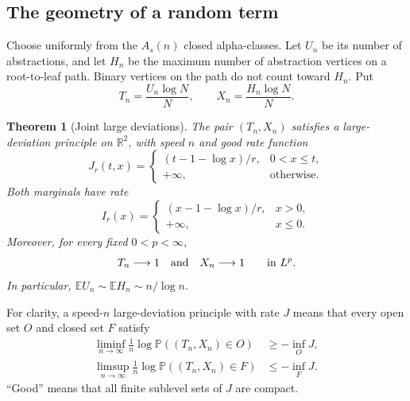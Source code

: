 \documentclass[11pt,a4paper]{article}
\numberwithin{equation}{section}
\newtheorem{theorem}{Theorem}[section]
\theoremstyle{remark}
\newcommand{\R}{\mathbb R}
\newcommand{\Prob}{\mathbb P}
\newcommand{\E}{\mathbb E}
\begin{document}
\subsection{The geometry of a random term}
Choose uniformly from the $A_s(n)$ closed alpha-classes. Let $U_n$ be its number of abstractions, and let $H_n$ be the maximum number of abstraction vertices on a root-to-leaf path. Binary vertices on the path do not count toward $H_n$. Put
\begin{equation}\label{lam:bg:eq:scaled}
 T_n=\frac{U_n\log N}{N},\qquad X_n=\frac{H_n\log N}{N}.
\end{equation}
\begin{theorem}[Joint large deviations]\label{lam:bg:thm:joint}
The pair $(T_n,X_n)$ satisfies a large-deviation principle on $\R^2$, with speed $n$ and good rate function
\begin{equation}\label{lam:bg:eq:joint-rate}
 J_r(t,x)=
 \begin{cases}
 (t-1-\log x)/r,&0<x\le t,\\
 +\infty,&\text{otherwise}.
 \end{cases}
\end{equation}
Both marginals have rate
\begin{equation}\label{lam:bg:eq:marginal-rate}
 I_r(x)=
 \begin{cases}(x-1-\log x)/r,&x>0,\\+\infty,&x\le0.\end{cases}
\end{equation}
Moreover, for every fixed $0<p<\infty$,
\[
 T_n\longrightarrow1\quad\hbox{and}\quad X_n\longrightarrow1
 \qquad\hbox{in }L^p.
\]
In particular, $\E U_n\sim\E H_n\sim n/\log n$.
\end{theorem}
For clarity, a speed-$n$ large-deviation principle with rate $J$ means that every open set $O$ and closed set $F$ satisfy
\begin{align*}
 \liminf_{n\to\infty}\frac1n\log\Prob((T_n,X_n)\in O)&\ge-\inf_O J,\\
 \limsup_{n\to\infty}\frac1n\log\Prob((T_n,X_n)\in F)&\le-\inf_F J.
\end{align*}
``Good'' means that all finite sublevel sets of $J$ are compact.
\end{document}
